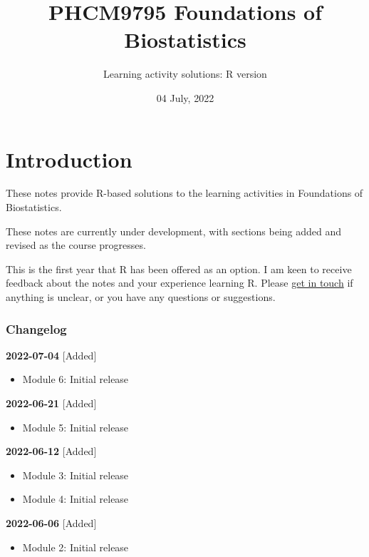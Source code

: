 \documentclass[
]{memoir}
\title{PHCM9795 Foundations of Biostatistics}
\author{Learning activity solutions: R version}
\date{04 July, 2022}
\providecommand{\tightlist}{%
  \setlength{\itemsep}{0pt}\setlength{\parskip}{0pt}}
\begin{document}
\maketitle

{
\setcounter{tocdepth}{1}
\tableofcontents
}
\hypertarget{introduction}{%
\chapter*{Introduction}\label{introduction}}

These notes provide R-based solutions to the learning activities in Foundations of Biostatistics.

These notes are currently under development, with sections being added and revised as the course progresses.

This is the first year that R has been offered as an option. I am keen to receive feedback about the notes and your experience learning R. Please \href{mailto:t.dobbins@unsw.edu.au}{get in touch} if anything is unclear, or you have any questions or suggestions.

\hypertarget{changelog}{%
\subsection*{Changelog}\label{changelog}}

\textbf{2022-07-04}
{[}Added{]}

\begin{itemize}
\tightlist
\item
  Module 6: Initial release
\end{itemize}

\textbf{2022-06-21}
{[}Added{]}

\begin{itemize}
\tightlist
\item
  Module 5: Initial release
\end{itemize}

\textbf{2022-06-12}
{[}Added{]}

\begin{itemize}
\tightlist
\item
  Module 3: Initial release
\item
  Module 4: Initial release
\end{itemize}

\textbf{2022-06-06}
{[}Added{]}

\begin{itemize}
\tightlist
\item
  Module 2: Initial release
\end{itemize}
\end{document}
